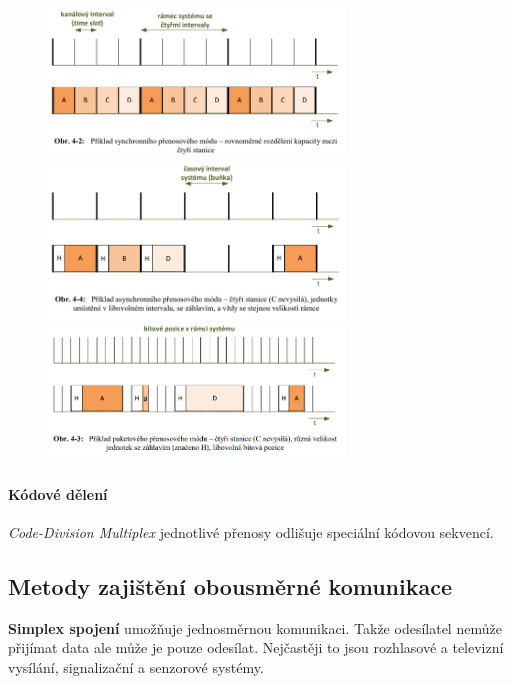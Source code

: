 \begin{figure}[ht]
	\centering
	\includegraphics[width=0.7\textwidth]{images/q04_time_synchronous}
	\includegraphics[width=0.7\textwidth]{images/q04_time_asynchronous}
	\includegraphics[width=0.7\textwidth]{images/q04_time_packet}
\end{figure}

\paragraph{Kódové dělení} \emph{Code-Division Multiplex} jednotlivé přenosy odlišuje speciální kódovou sekvencí.

\subsection{Metody zajištění obousměrné komunikace}
\label{q07}

\textbf{Simplex spojení} umožňuje jednosměrnou komunikaci. Takže odesílatel nemůže přijímat data ale může je pouze odesílat. Nejčastěji to jsou rozhlasové a televizní vysílání, signalizační a senzorové systémy.

